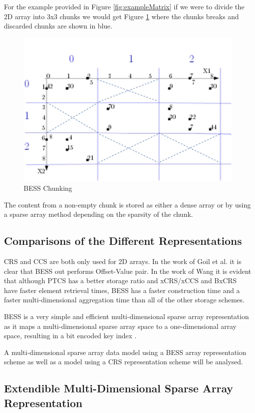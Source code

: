 For the example provided in Figure \ref{fig:exampleMatrix} if we were to divide the 2D array into 3x3 chunks we would get Figure \ref{fig:chunk} where the chunks breaks and discarded chunks are shown in blue.

 \begin{figure}[H]
	\centering
	\includegraphics[width=0.7\linewidth]{chunked}
	\caption{BESS Chunking}
	\label{fig:chunk}
\end{figure}

The content from a non-empty chunk is stored as either a dense array or by using a sparse array method depending on the sparsity of the chunk.

\subsection{Comparisons of the Different Representations}

CRS and CCS are both only used for 2D arrays. In the work of Goil et al. \cite{goil:bess} it is clear that BESS out performs Offset-Value pair. In the work of Wang \cite{wang:2014sar} it is evident that although PTCS has a better storage ratio and xCRS/xCCS and BxCRS have faster element retrieval times, BESS has a faster construction time and a faster multi-dimensional aggregation time than all of the other storage schemes. 

BESS is a very simple and efficient multi-dimensional sparse array representation as it maps a multi-dimensional sparse array space to a one-dimensional array space, resulting in a bit encoded key index \cite{wang:2014sar}.

A multi-dimensional sparse array data model using a BESS array representation scheme as well as a model using a CRS representation scheme will be analysed.

\subsection{Extendible Multi-Dimensional Sparse Array Representation}

